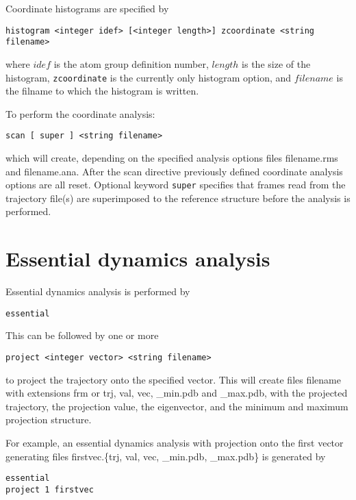 Coordinate histograms are specified by

\begin{verbatim}
histogram <integer idef> [<integer length>] zcoordinate <string filename>
\end{verbatim}

where $idef$ is the atom group definition number, $length$ is the size
of the histogram, \verb+zcoordinate+ is the currently only histogram option,
and $filename$ is the filname to which the histogram is written.

To perform the coordinate analysis:

\begin{verbatim}
scan [ super ] <string filename>
\end{verbatim}

which will create, depending on the specified analysis options
files filename.rms and filename.ana. After the scan directive
previously defined coordinate analysis options are all reset.
Optional keyword \verb+super+ specifies that frames read from
the trajectory file(s) are superimposed to the reference structure
before the analysis is performed.

\section{Essential dynamics analysis}

Essential dynamics analysis is performed by

\begin{verbatim}
essential
\end{verbatim}

This can be followed by one or more

\begin{verbatim}
project <integer vector> <string filename>
\end{verbatim}

to project the trajectory onto the specified vector. This will
create files filename with extensions frm or trj, val, vec, \_min.pdb
and \_max.pdb, with the projected trajectory, the projection
value, the eigenvector, and the minimum and maximum projection
structure.

For example, an essential dynamics analysis with projection onto
the first vector generating files firstvec.\{trj, val, vec, \_min.pdb, \_max.pdb\}
is generated by

\begin{verbatim}
essential
project 1 firstvec
\end{verbatim}

